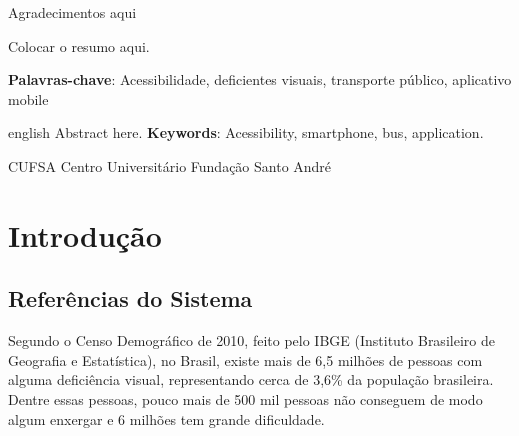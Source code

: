 \documentclass[
	12pt,				%
	oneside,			%
	a4paper,			%
	brazil				%
]{abntex2}
\newcommand*{\BeginNoToc}{%
  \addtocontents{toc}{%
    \edef\protect\SavedTocDepth{\protect\the\protect\value{tocdepth}}%
  }%
  \addtocontents{toc}{%
    \protect\setcounter{tocdepth}{-10}%
  }%
}
\newcommand*{\EndNoToc}{%
  \addtocontents{toc}{%
    \protect\setcounter{tocdepth}{\protect\SavedTocDepth}%
  }%
}
\begin{document}
\begin{agradecimentos} 
Agradecimentos aqui
\end{agradecimentos} 


\setlength{\absparsep}{18pt} %
\begin{resumo}
 
Colocar o resumo aqui.

 \textbf{Palavras-chave}: Acessibilidade, deficientes visuais, transporte público, aplicativo mobile
\end{resumo}

\begin{resumo}[Abstract] 
\begin{otherlanguage*}{english}
Abstract here.
\vspace{\onelineskip} 
\noindent \textbf{Keywords}: Acessibility, smartphone, bus, application. 
\end{otherlanguage*} 
\end{resumo} 

\BeginNoToc
\tableofcontents*
\newpage
\listoffigures
\EndNoToc

\begin{siglas} 
\item[CUFSA] Centro Universitário Fundação Santo André
\end{siglas}
\EndNoToc

\textual

\chapter{Introdução}

\section{Referências do Sistema}

Segundo o Censo Demográfico de 2010, feito pelo IBGE (Instituto Brasileiro de Geografia e Estatística), no Brasil, existe mais de 6,5 milhões de pessoas com alguma deficiência visual, representando cerca de 3,6\% da população brasileira. Dentre essas pessoas, pouco mais de 500 mil pessoas não conseguem de modo algum enxergar e 6 milhões tem grande dificuldade.
\end{document}

